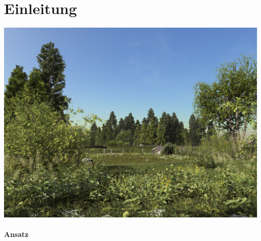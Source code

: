 \newpage
\slidetitle{}
\section{Einleitung}
\begin{center}
	\includegraphics[height=.85\textheight]{images/CH1_greenXfrog_JanWalterSchliep.jpg}
	\cite{GreenOne:16}
\end{center}

	
	


\newpage
{}
\paragraph{Ansatz\\}

